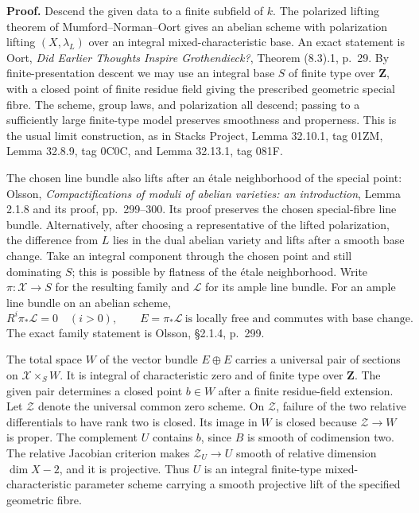 \documentclass[11pt]{article}
\theoremstyle{remark}\newtheorem{remark}[theorem]{Remark}
\begin{document}
\textbf{Proof.}
Descend the given data to a finite subfield of $k$. The polarized
lifting theorem of Mumford--Norman--Oort gives an abelian scheme
with polarization lifting $(X,\lambda_L)$ over an integral
mixed-characteristic base. An exact statement is Oort,
\emph{Did Earlier Thoughts Inspire Grothendieck?}, Theorem (8.3).1,
p.~29. By finite-presentation descent we may use an integral base
$S$ of finite type over $\mathbf Z$, with a closed point of finite
residue field giving the prescribed geometric special fibre. The
scheme, group laws, and polarization all descend; passing to a
sufficiently large finite-type model preserves smoothness and
properness. This is the usual limit construction, as in Stacks
Project, Lemma 32.10.1, tag 01ZM, Lemma 32.8.9, tag 0C0C,
and Lemma 32.13.1, tag 081F.

The chosen line bundle also lifts after an \'etale neighborhood of
the special point: Olsson, \emph{Compactifications of moduli of
abelian varieties: an introduction}, Lemma 2.1.8 and its proof,
pp.~299--300. Its proof preserves the chosen special-fibre line
bundle. Alternatively, after choosing a representative of the
lifted polarization, the difference from $L$ lies in the dual
abelian variety and lifts after a smooth base change. Take an
integral component through the chosen point and still dominating
$S$; this is possible by flatness of the \'etale neighborhood.
Write $\pi:\mathcal X\to S$ for the resulting family and
$\mathcal L$ for its ample line bundle. For an ample line bundle
on an abelian scheme,
\[
 R^i\pi_*\mathcal L=0\quad(i>0),\qquad
 E=\pi_*\mathcal L\ \text{is locally free and commutes with base change}.
\]
The exact family statement is Olsson, \S2.1.4, p.~299.

The total space $W$ of the vector bundle $E\oplus E$ carries a
universal pair of sections on $\mathcal X\times_S W$. It is
integral of characteristic zero and of finite type over
$\mathbf Z$. The given pair determines a closed point $b\in W$
after a finite residue-field extension. Let $\mathcal Z$ denote
the universal common zero scheme. On $\mathcal Z$, failure of the
two relative differentials to have rank two is closed. Its image
in $W$ is closed because $\mathcal Z\to W$ is proper. The
complement $U$ contains $b$, since $B$ is smooth of codimension
two. The relative Jacobian criterion makes $\mathcal Z_U\to U$
smooth of relative dimension $\dim X-2$, and it is projective.
Thus $U$ is an integral finite-type mixed-characteristic
parameter scheme carrying a smooth projective lift of the
specified geometric fibre.
\end{document}
